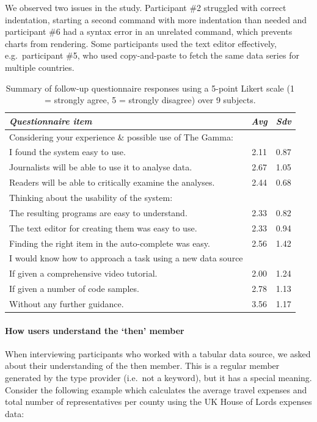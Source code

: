 \documentclass[manuscript,review,anonymous]{acmart}
\newcommand{\ikvd}[1]{{\fontfamily{zi4}\selectfont\small #1}}
\begin{document}
We observed two issues in the study. Participant \#2 struggled with correct indentation, starting a second command
with more indentation than needed and participant \#6 had a syntax error in an unrelated command,
which prevents charts from rendering. Some participants used the text editor effectively,
e.g.~participant \#5, who used copy-and-paste to fetch the same data series for multiple countries.

\begin{table}
  \centering
  \begin{tabular}{p{19em} c c}
    \toprule
      {\small \textit{Questionnaire item}} & {\small \textit{Avg}} & {\small \textit{Sdv}} \\
    \midrule
    \small Considering your experience \& possible use of The Gamma:\\
    \small \quad I found the system easy to use. & \small 2.11 & \small 0.87\\
    \small \quad Journalists will be able to use it to analyse data. & \small 2.67 & \small 1.05\\
    \small \quad Readers will be able to critically examine the analyses. & \small 2.44 & \small 0.68\\
    \small Thinking about the usability of the system:\\
    \small \quad The resulting programs are easy to understand. & \small 2.33 & \small 0.82\\
    \small \quad The text editor for creating them was easy to use. & \small 2.33 & \small 0.94\\
    \small \quad Finding the right item in the auto-complete was easy. & \small 2.56 & \small 1.42\\
    \small I would know how to approach a task using a new data source\\
    \small \quad If given a comprehensive video tutorial. & \small 2.00 & \small 1.24\\
    \small \quad If given a number of code samples. & \small 2.78 & \small 1.13\\
    \small \quad Without any further guidance. & \small 3.56 & \small 1.17\\
    \bottomrule
  \end{tabular}
  \caption{Summary of follow-up questionnaire responses using
    a 5-point Likert scale (1 = strongly agree, 5 = strongly disagree) over 9 subjects.}
  \label{tab:quest}
\end{table}

\paragraph{How users understand the `then' member}
When interviewing participants who worked with a tabular data source, we
asked about their understanding of the \ikvd{then} member. This is a regular member generated by the
type provider (i.e.~not a keyword), but it has a special meaning. Consider
the following example which calculates the average travel expenses and total number of
representatives per county using the UK House of Lords expenses data:
\end{document}
